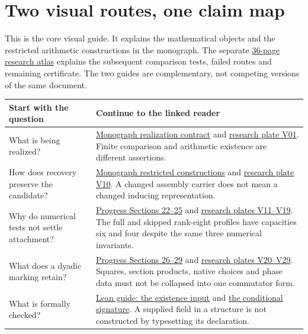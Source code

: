 \section*{Two visual routes, one claim map}
{}
This is the core visual guide. It explains the mathematical objects and the restricted arithmetic constructions in the monograph. The separate \href{https://komorebi.invalid/b06/visual_atlas}{36-page research atlas} explains the subsequent comparison tests, failed routes and remaining certificate. The two guides are complementary, not competing versions of the same document.

\begin{tabular}{@{}>{\raggedright\arraybackslash}p{.28\linewidth}>{\raggedright\arraybackslash}p{.67\linewidth}@{}}\toprule
Start with the question & Continue to the linked reader\\\midrule
What is being realized? & \href{https://komorebi.invalid/b06/visual_contract}{Monograph realization contract} and \href{https://komorebi.invalid/b06/visual_v01}{research plate V01}. Finite comparison and arithmetic existence are different assertions.\\[9pt]
How does recovery preserve the candidate? & \href{https://komorebi.invalid/b06/visual_recovery}{Monograph restricted constructions} and \href{https://komorebi.invalid/b06/visual_v10}{research plate V10}. A changed assembly carrier does not mean a changed inducing representation.\\[9pt]
Why do numerical tests not settle attachment? & \href{https://komorebi.invalid/b06/visual_conductors}{Progress Sections 22--25} and \href{https://komorebi.invalid/b06/visual_v15}{research plates V11--V19}. The full and skipped rank-eight profiles have capacities six and four despite the same three numerical invariants.\\[9pt]
What does a dyadic marking retain? & \href{https://komorebi.invalid/b06/visual_marks}{Progress Sections 26--29} and \href{https://komorebi.invalid/b06/visual_v20}{research plates V20--V29}. Squares, section products, native choices and phase data must not be collapsed into one commutator form.\\[9pt]
What is formally checked? & \href{https://komorebi.invalid/b06/visual_lean_input}{Lean guide: the existence input} and \href{https://komorebi.invalid/b06/visual_lean_signature}{the conditional signature}. A supplied field in a structure is not constructed by typesetting its declaration.\\\bottomrule
\end{tabular}

